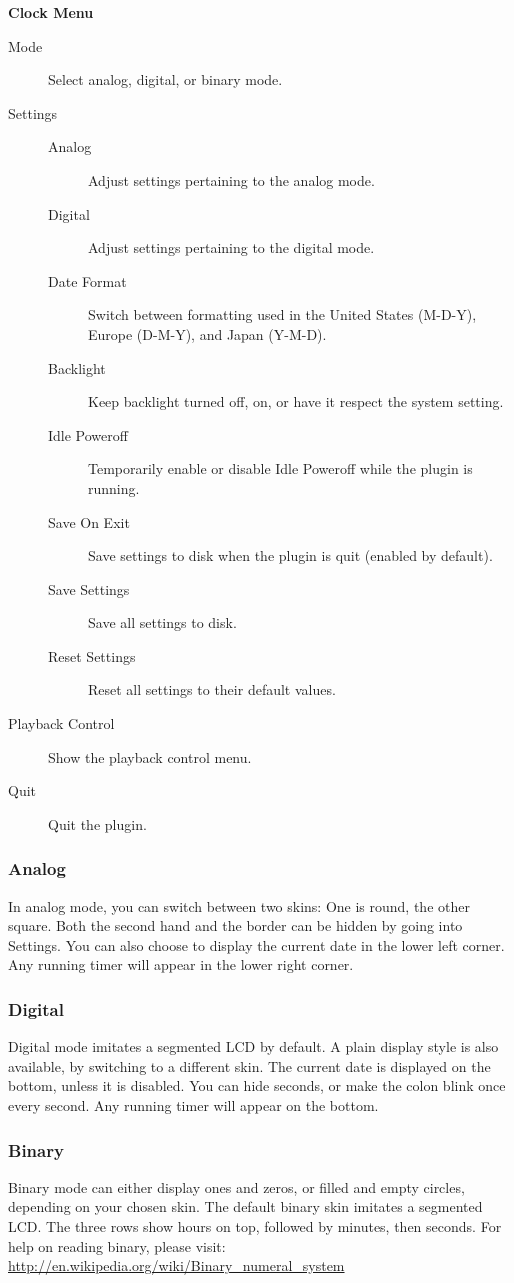 \textbf{Clock Menu}
\begin{description}
\item[Mode] Select analog, digital, or binary mode.
\item[Settings]
    \begin{description}
    \item[Analog] Adjust settings pertaining to the analog mode.
    \item[Digital] Adjust settings pertaining to the digital mode.
    \item[Date Format]
    Switch between formatting used in the United States (M-D-Y), Europe (D-M-Y), and Japan (Y-M-D).
    \item[Backlight]
    Keep backlight turned off, on, or have it respect the system setting.
    \item[Idle Poweroff]
    Temporarily enable or disable Idle Poweroff while the plugin is running.
    \item[Save On Exit]
    Save settings to disk when the plugin is quit (enabled by default).
    \item[Save Settings]
    Save all settings to disk.
    \item[Reset Settings]
    Reset all settings to their default values.
    \end{description}
\item[Playback Control] Show the playback control menu.
\item[Quit] Quit the plugin.
\end{description}

\subsubsection{Analog}
In analog mode, you can switch between two skins: One is round, the other square.
Both the second hand and the border can be hidden by going into Settings.
You can also choose to display the current date in the lower left corner.
Any running timer will appear in the lower right corner.


\subsubsection{Digital}
Digital mode imitates a segmented LCD by default. A plain display style is
also available, by switching to a different skin.
The current date is displayed on the bottom, unless it is disabled.
You can hide seconds, or make the colon blink once every second.
Any running timer will appear on the bottom.

\subsubsection{Binary}
Binary mode can either display ones and zeros, or filled and empty circles, depending
on your chosen skin. The default binary skin imitates a segmented LCD.
The three rows show hours on top, followed by minutes, then seconds.
For help on reading binary, please visit:
\url{http://en.wikipedia.org/wiki/Binary_numeral_system}
